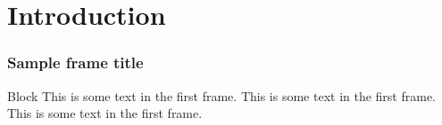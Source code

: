 
\section{Introduction}

\begin{frame}
    \frametitle{Sample frame title}
    \begin{block}{Block}
        This is some text in the first frame. This is some text in the first frame. This is some text in the first frame.
    \end{block}
\end{frame}
